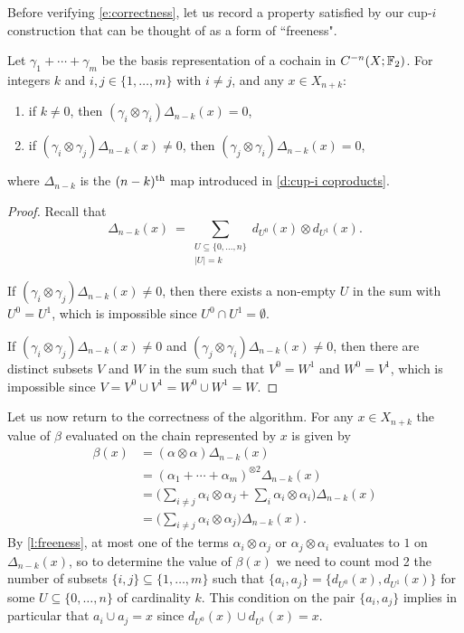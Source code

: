 Before verifying \eqref{e:correctness}, let us record a property satisfied by our cup-$i$ construction that can be thought of as a form of ``freeness".

\begin{lemma} \label{l:freeness}
	Let $\gamma_1 + \cdots + \gamma_m$ be the basis representation of a cochain in $C^{-n}(X; \mathbb{F}_2)$.
	For integers $k$ and $i, j \in \{1, \dots, m\}$ with $i \neq j$, and any $x \in X_{n+k}$:
	\begin{enumerate}
		\item if $k \neq 0$, then $(\gamma_i \otimes \gamma_i)\Delta_{n-k}(x) = 0$,
		\item if $(\gamma_i \otimes \gamma_j)\Delta_{n-k}(x) \neq 0$, then $(\gamma_j \otimes \gamma_i)\Delta_{n-k}(x) = 0$,
	\end{enumerate}
	where $\Delta_{n-k}$ is the $(n-k)^\mathrm{th}$ map introduced in \cref{d:cup-i coproducts}.
\end{lemma}

\begin{proof}
	Recall that
	\begin{equation*}
	\Delta_{n-k}(x) \ = \! \sum_{\substack{U \subseteq \{0, \dots, n\} \\ \vert U \vert = k}}
	d_{U^0}(x) \otimes d_{U^1}(x).
	\end{equation*}
	
	If $(\gamma_i \otimes \gamma_j)\Delta_{n-k}(x) \neq 0$, then there exists a non-empty $U$ in the sum with $U^0 = U^1$, which is impossible since $U^0 \cap U^1 = \emptyset$.
	
	If $(\gamma_i \otimes \gamma_j)\Delta_{n-k}(x) \neq 0$ and $(\gamma_j \otimes \gamma_i)\Delta_{n-k}(x) \neq 0$, then there are distinct subsets $V$ and $W$ in the sum such that $V^0 = W^1$ and $W^0 = V^1$, which is impossible since $V = V^0 \cup V^1 = W^0 \cup W^1 = W$.
\end{proof}

Let us now return to the correctness of the algorithm.
For any $x \in X_{n+k}$ the value of $\beta$ evaluated on the chain represented by $x$ is given by 
\begin{align*}
\beta(x) & =
(\alpha \otimes \alpha) \Delta_{n-k}(x) \\ & =
(\alpha_1 + \cdots + \alpha_m)^{\otimes 2} \Delta_{n-k}(x) \\ & =
\Big(\sum_{i \neq j} \alpha_i \otimes \alpha_j + \sum_{i} \alpha_i \otimes \alpha_i \Big)
\Delta_{n-k}(x) \\ & =
\Big(\sum_{i \neq j} \alpha_i \otimes \alpha_j\Big)
\Delta_{n-k}(x).
\end{align*}
By \cref{l:freeness}, at most one of the terms $\alpha_i \otimes \alpha_j$ or $\alpha_j \otimes \alpha_i$ evaluates to $1$ on $\Delta_{n-k}(x)$, so to determine the value of $\beta(x)$ we need to count mod 2 the number of subsets $\{i,j\} \subseteq \{1,\dots, m\}$ such that $\{a_i, a_j\} = \{d_{U^0}(x), d_{U^1}(x)\}$ for some $U \subseteq \{0, \dots, n\}$ of cardinality $k$.
This condition on the pair $\{a_i, a_j\}$ implies in particular that $a_i \cup a_j = x$ since $d_{U^0}(x) \cup d_{U^1}(x) = x$.

